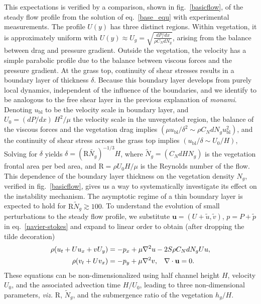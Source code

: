\documentclass[aps,prl,twocolumn,superscriptaddress,10pt]{revtex4-1}  %
\newcommand{\bu}{\mathbf{u}}
\newcommand{\Rey}{\text{R}}
\newcommand{\Ndg}{\tilde{N}_g}
\newcommand{\monami}{\textit{monami}}
\newcommand{\ubl}{u_\text{bl}}
\begin{document}
This expectations is verified by a comparison, shown in fig.~\ref{basicflow}, of the steady flow profile from the solution of eq.~\eqref{base_equ} with experimental measurements.
The profile $U(y)$ has three distinct regions.
Within vegetation, it is approximately uniform with $ U(y) \approx U_g = \sqrt{\frac{dP/dx}{\rho C_N dN_g}}$, arising from the balance between drag and pressure gradient. 
Outside the vegetation, the velocity has a simple parabolic profile due to the balance between viscous forces and the pressure gradient. 
At the grass top, continuity of shear stresses results in a boundary layer of thickness $\delta$. 
Because this boundary layer develops from purely local dynamics, independent of the influence of the boundaries, and we identify to be analogous to the free shear layer \cite{Ghisal02} in the previous explanation of \monami.
Denoting $\ubl$ to be the velocity scale in boundary layer, and $U_0 = {(dP/dx)~H^2}/{\mu}$ the velocity scale in the unvegetated region, the balance of the viscous forces and the vegetation drag implies $(\mu \ubl/\delta^2 \sim \rho C_N d N_g \ubl^2)$, and the continuity of shear stress across the grass top implies $(\ubl/\delta \sim U_0/H)$,  
Solving for $\delta$ yields $\delta=(\Rey\tilde{N_g})^{-1/3}H$, where $\Ndg = \left(C_N d H N_g\right)$ is the vegetation frontal area per bed area, and $\Rey=\rho U_0 H/\mu$ is the Reynolds number of the flow. 
This dependence of the boundary layer thickness on the vegetation density $N_g$, verified in fig.~\ref{basicflow}, gives us a way to systematically investigate its effect on the instability mechanism.
The asymptotic regime of a thin boundary layer is expected to hold for $\Rey \Ndg \gtrsim 100$.
\newline
To understand the evolution of small perturbations to the steady flow profile, we substitute $\bu = (U+\tilde{u}, \tilde{v})$, $p=P+\tilde{p}$ in eq.~\eqref{navier-stokes} and expand to linear order to obtain (after dropping the tilde decoration)
\begin{equation}
\begin{split}
\rho(u_t+U u_x+vU_y) &= -p_x+ {\mu}\nabla^2u-2S\rho C_{N}dN_{g}Uu, \\
\rho(v_t+ Uv_x) &= -p_y+ {\mu}\nabla^2v, \hspace{0.3cm} \nabla\cdot\bu=0.
\end{split}
\end{equation}
These equations can be non-dimensionalized using half channel height $H$, velocity $U_0$, and the associated advection time $H/U_0$, leading to three non-dimensional parameters, \textit{viz.} $\Rey$, $\Ndg$, and the submergence ratio of the vegetation $h_g/H$. 
\end{document}
